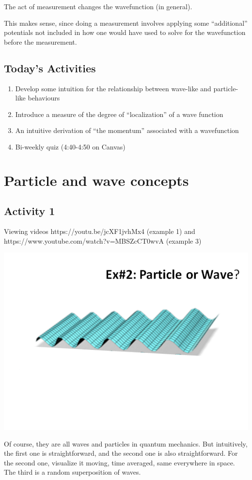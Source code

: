 \documentclass{article}
\begin{document}
The act of measurement changes the wavefunction (in general).

This makes sense, since doing a measurement involves applying some “additional” potentials not included in how one would have used to solve for the wavefunction before the measurement.

\subsection*{Today's Activities}

\begin{enumerate}
    \item Develop some intuition for the relationship between wave-like and particle-like behaviours
    \item Introduce a measure of the degree of “localization” of a wave function
    \item An intuitive derivation of “the momentum” associated with a wavefunction
    \item Bi-weekly quiz (4:40-4:50 on Canvas)
\end{enumerate}

\section{Particle and wave concepts}

\subsection{Activity 1}

Viewing videos https://youtu.be/jcXF1jvhMx4 (example 1) and https://www.youtube.com/watch?v=MBSZcCT0wvA
(example 3)

\includegraphics[width = 0.6 \textwidth]{Lecture03/1.png}

Of course, they are all waves and particles in quantum mechanics. But intuitively, the first one is straightforward, and the second one is also straightforward. For the second one, visualize it moving, time averaged, same everywhere in space. The third is a random superposition of waves. 
\end{document}
